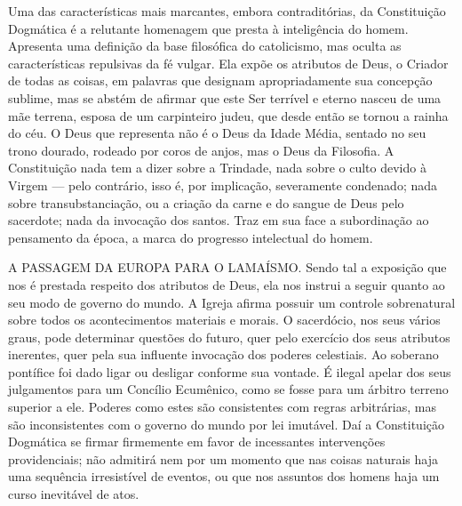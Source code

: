 \documentclass[11pt,a5paper,twoside,openany]{book}
\begin{document}
Uma das características mais marcantes, embora contraditórias, da Constituição Dogmática é a relutante homenagem que presta à inteligência do homem. Apresenta uma definição da base filosófica do catolicismo, mas oculta as características repulsivas da fé vulgar. Ela expõe os atributos de Deus, o Criador de todas as coisas, em palavras que designam apropriadamente sua concepção sublime, mas se abstém de afirmar que este Ser terrível e eterno nasceu de uma mãe terrena, esposa de um carpinteiro judeu, que desde então se tornou a rainha do céu. O Deus que representa não é o Deus da Idade Média, sentado no seu trono dourado, rodeado por coros de anjos, mas o Deus da Filosofia. A Constituição nada tem a dizer sobre a Trindade, nada sobre o culto devido à Virgem — pelo contrário, isso é, por implicação, severamente condenado; nada sobre transubstanciação, ou a criação da carne e do sangue de Deus pelo sacerdote; nada da invocação dos santos. Traz em sua face a subordinação ao pensamento da época, a marca do progresso intelectual do homem.

A PASSAGEM DA EUROPA PARA O LAMAÍSMO. Sendo tal a exposição que nos é prestada respeito dos atributos de Deus, ela nos instrui a seguir quanto ao seu modo de governo do mundo. A Igreja afirma possuir um controle sobrenatural sobre todos os acontecimentos materiais e morais. O sacerdócio, nos seus vários graus, pode determinar questões do futuro, quer pelo exercício dos seus atributos inerentes, quer pela sua influente invocação dos poderes celestiais. Ao soberano pontífice foi dado ligar ou desligar conforme sua vontade. É ilegal apelar dos seus julgamentos para um Concílio Ecumênico, como se fosse para um árbitro terreno superior a ele. Poderes como estes são consistentes com regras arbitrárias, mas são inconsistentes com o governo do mundo por lei imutável. Daí a Constituição Dogmática se firmar firmemente em favor de incessantes intervenções providenciais; não admitirá nem por um momento que nas coisas naturais haja uma sequência irresistível de eventos, ou que nos assuntos dos homens haja um curso inevitável de atos.
\end{document}

